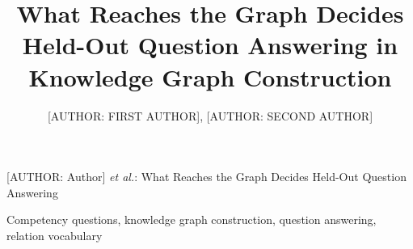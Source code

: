 \documentclass{ieeeaccess}
\begin{document}
\setlength{\textfloatsep}{7pt plus 2pt minus 2pt}
\setlength{\intextsep}{7pt plus 2pt minus 2pt}
\setlength{\dbltextfloatsep}{7pt plus 2pt minus 2pt}
\setlength{\abovedisplayskip}{6pt plus 2pt minus 2pt}
\setlength{\belowdisplayskip}{6pt plus 2pt minus 2pt}


\title{What Reaches the Graph Decides Held-Out Question Answering in Knowledge Graph Construction}

\author{\uppercase{[AUTHOR: First Author]}, \uppercase{[AUTHOR: Second Author]}}
\address[1]{[AUTHOR: affiliation and e-mail]}
\address[2]{[AUTHOR: affiliation and e-mail]}

{[AUTHOR: Author] \emph{et al.}: What Reaches the Graph Decides Held-Out Question Answering}




\begin{keywords}
Competency questions, knowledge graph construction, question answering, relation vocabulary
\end{keywords}

\titlepgskip=-15pt

\maketitle












\appendices


\EOD
\end{document}
